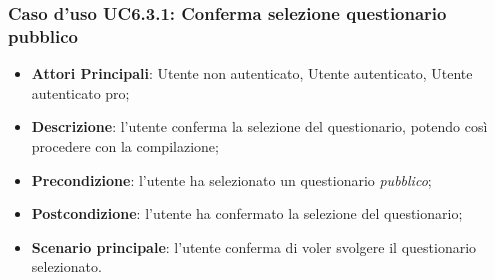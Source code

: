 \subsubsection{Caso d'uso UC6.3.1: Conferma selezione questionario pubblico}
\label{UC6.3.1}
\begin{itemize}
\item\textbf{Attori Principali}: Utente non autenticato, Utente autenticato, Utente autenticato pro;
\item\textbf{Descrizione}: l'utente conferma la selezione del questionario, potendo così procedere con la compilazione;
\item\textbf{Precondizione}: l'utente ha selezionato un questionario \textit{pubblico};
\item\textbf{Postcondizione}: l'utente ha confermato la selezione del questionario;
\item\textbf{Scenario principale}: l'utente conferma di voler svolgere il questionario selezionato.
\end{itemize}

